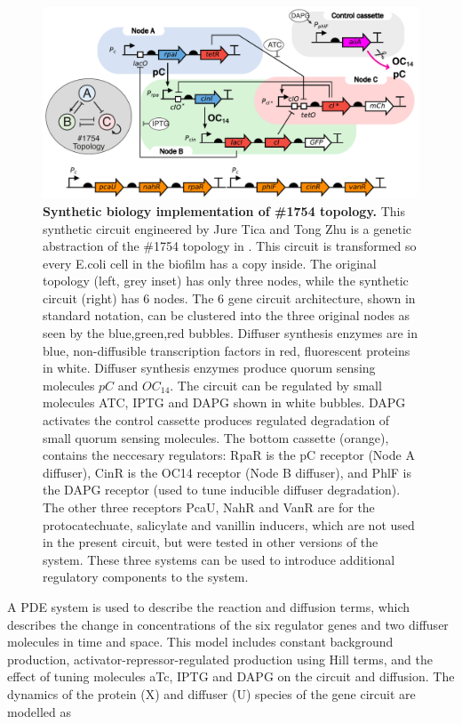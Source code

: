 \begin{figure}[H]
    \centering
    \includegraphics[width=1\textwidth]{chapters/Chapter 2/synthetic circuit2}
    \caption{\textbf{Synthetic biology implementation of \#1754 topology.} This synthetic circuit engineered by Jure Tica and Tong Zhu is a genetic abstraction of the \#1754 topology in \cite{Scholes2019}. This circuit is transformed so every E.coli cell in the biofilm has a copy inside. The original topology (left, grey inset) has only three nodes, while the synthetic circuit (right) has 6 nodes. The 6 gene circuit architecture, shown in standard notation, can be clustered into the three original nodes as seen by the blue,green,red bubbles. Diffuser synthesis enzymes are in blue, non-diffusible transcription
    factors in red, fluorescent proteins in white. Diffuser synthesis enzymes produce quorum sensing molecules $pC$ and $OC_{14}$. The circuit can be regulated by small molecules ATC, IPTG and DAPG shown in white bubbles. DAPG activates the control cassette produces regulated degradation of small quorum sensing molecules. The bottom cassette (orange), contains the neccesary regulators: RpaR is the pC receptor (Node A diffuser), CinR is the OC14 receptor (Node B diffuser), and PhlF is the DAPG receptor (used to tune inducible diffuser degradation). The other three receptors PcaU, NahR and VanR are for the protocatechuate, salicylate and vanillin inducers, which are not used in the present circuit, but were tested in other versions of the system. These three systems can be used to introduce additional regulatory components to the system. }
    \label{fig:synthetic circuit_chapter2}
\end{figure}


A PDE system is used to describe the reaction and diffusion terms, which describes the change in concentrations of the six regulator genes and two diffuser molecules in time and space.
This model includes constant background production, activator-repressor-regulated production using Hill terms, and the effect of tuning molecules aTc, IPTG and DAPG on the circuit and diffusion.
The dynamics of the protein (X) and diffuser (U) species of the gene circuit are modelled as

